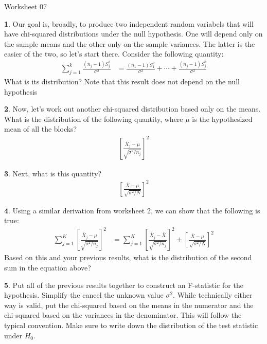 \documentclass{tufte-handout}
\begin{document}
\justify

{\LARGE Worksheet 07}

\vspace*{18pt}


\textbf{1}. Our goal is, broadly, to produce two independent random variabels that will have
chi-squared distributions under the null hypothesis. One will depend only on
the sample means and the other only on the sample variances. The latter is the
easier of the two, so let's start there. Consider the following quantity:
\begin{align*}
\sum_{j=1}^k \frac{(n_j - 1) S_j^2}{\sigma^2} &= \frac{(n_1 - 1) S_1^2}{\sigma^2} + \cdots + \frac{(n_j - 1) S_j^2}{\sigma^2}
\end{align*}
What is its distribution? Note that this result does not depend on the null
hypothesis

\textbf{2}. Now, let's work out another chi-squared distribution based only on the means.
What is the distribution of the following quantity, where $\mu$ is the
hypothesized mean of all the blocks?
\begin{align*}
\left[\frac{\bar{X}_j - \mu}{\sqrt{\sigma^2 / n_j}}\right]^2
\end{align*} 

\textbf{3}. Next, what is this quantity?
\begin{align*}
\left[\frac{\bar{X} - \mu}{\sqrt{\sigma^2 / N}}\right]^2
\end{align*} 

\textbf{4}. Using a similar derivation from worksheet 2, we can show that the following
is true:
\begin{align*}
\sum_{j=1}^K \left[\frac{\bar{X}_j - \mu}{\sqrt{\sigma^2 / n_j}}\right]^2 &=
\sum_{j=1}^K \left[\frac{\bar{X}_j - \bar{X}}{\sqrt{\sigma^2 / n_j}}\right]^2 +
\left[\frac{\bar{X} - \mu}{\sqrt{\sigma^2 / N}}\right]^2
\end{align*} 
Based on this and your previous results, what is the distribution of the 
second sum in the equation above?

\textbf{5}. Put all of the previous results together to construct an F-statistic for the
hypothesis. Simplify the cancel the unknown value $\sigma^2$. While technically
either way is valid, put the chi-squared based on the means in the numerator and
the chi-squared based on the variances in the denominator. This will follow the
typical convention. Make sure to write down the distribution of the test statistic
under $H_0$.
\end{document}
